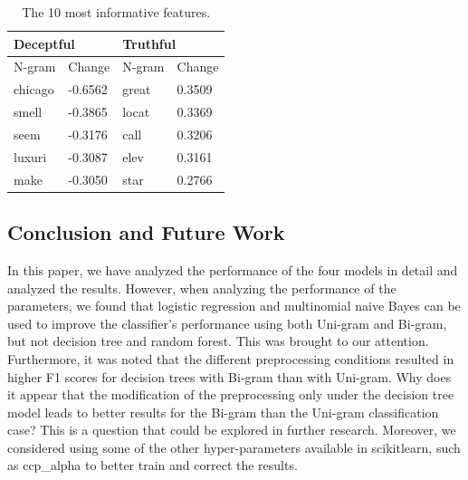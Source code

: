 \documentclass[a4paper, 11pt]{article}
\begin{document}
\begin{table}[h]
\centering
\caption{The 10 most informative features.}
\begin{tabular}{ll|ll}
\hline
\multicolumn{2}{l|}{\textbf{Deceptful}} & \multicolumn{2}{l}{\textbf{Truthful}} \\ \hline
N-gram             & Change             & N-gram            & Change            \\
chicago            & -0.6562            & great             & 0.3509            \\
smell              & -0.3865            & locat             & 0.3369            \\
seem               & -0.3176            & call              & 0.3206            \\
luxuri             & -0.3087            & elev              & 0.3161            \\
make               & -0.3050            & star              & 0.2766            \\ \hline
\end{tabular}
\label{most important}
\end{table}
\begin{multicols}{2}


\section{Conclusion and Future Work} %
In this paper, we have analyzed the performance of the four models in detail and analyzed the results. However, when analyzing the performance of the parameters, we found that logistic regression and multinomial naive Bayes can be used to improve the classifier's performance using both Uni-gram and Bi-gram, but not decision tree and random forest. This was brought to our attention. Furthermore, it was noted that the different preprocessing conditions resulted in higher F1 scores for decision trees with Bi-gram than with Uni-gram. Why does it appear that the modification of the preprocessing only under the decision tree model leads to better results for the Bi-gram than the Uni-gram classification case? This is a question that could be explored in further research. Moreover, we considered using some of the other hyper-parameters available in scikit\-learn, such as ccp\_alpha to better train and correct the results.




\end{multicols}
\end{document}
